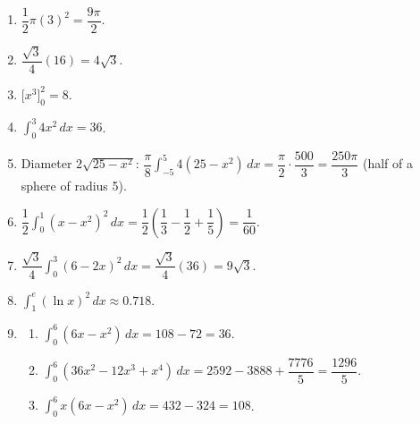 \documentclass[11pt]{article}
\begin{document}
\newpage
\begin{solbox}
\begin{enumerate}[leftmargin=*,itemsep=4pt]
  \item $\dfrac12\pi(3)^2=\dfrac{9\pi}{2}$.
  \item $\dfrac{\sqrt3}{4}(16)=4\sqrt3$.
  \item $\Big[x^3\Big]_0^2=8$.
  \item $\displaystyle\int_{0}^{3}4x^2\,dx=36$.
  \item Diameter $2\sqrt{25-x^2}$: $\dfrac\pi8\displaystyle\int_{-5}^{5}4(25-x^2)\,dx=\dfrac\pi2\cdot\dfrac{500}{3}=\dfrac{250\pi}{3}$ (half of a sphere of radius 5).
  \item $\dfrac12\displaystyle\int_{0}^{1}(x-x^2)^2\,dx=\dfrac12\left(\dfrac13-\dfrac12+\dfrac15\right)=\dfrac{1}{60}$.
  \item $\dfrac{\sqrt3}{4}\displaystyle\int_{0}^{3}(6-2x)^2\,dx=\dfrac{\sqrt3}{4}(36)=9\sqrt3$.
  \item $\displaystyle\int_{1}^{e}(\ln x)^2\,dx\approx0.718$.
  \item \begin{enumerate}[label=(\alph*),leftmargin=*,itemsep=3pt]
    \item $\displaystyle\int_{0}^{6}(6x-x^2)\,dx=108-72=36$.
    \item $\displaystyle\int_{0}^{6}(36x^2-12x^3+x^4)\,dx=2592-3888+\dfrac{7776}{5}=\dfrac{1296}{5}$.
    \item $\displaystyle\int_{0}^{6}x(6x-x^2)\,dx=432-324=108$.
  \end{enumerate}
\end{enumerate}
\end{solbox}
\end{document}

